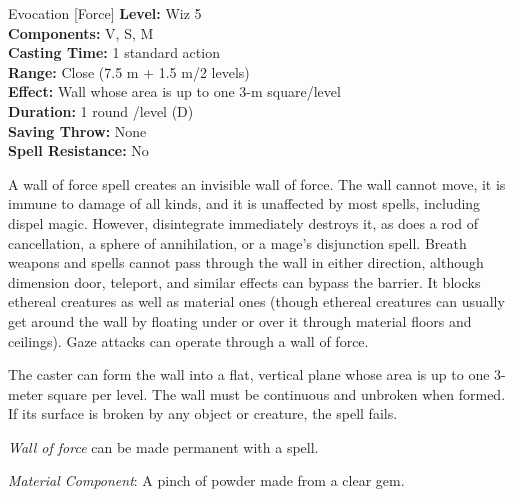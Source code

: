 {Evocation [Force]}
{
	\textbf{Level:}
	Wiz 5\\
	\textbf{Components:}
	V, S, M\\
	\textbf{Casting Time:}
	1 standard action\\
	\textbf{Range:}
	Close (7.5 m + 1.5 m/2 levels)\\
	\textbf{Effect:}
	Wall whose area is up to one 3-m square/level\\
	\textbf{Duration:}
	1 round /level (D)\\
	\textbf{Saving Throw:}
	None\\
	\textbf{Spell Resistance:}
	No\\
}
{
	A wall of force spell creates an invisible wall of force. The wall cannot move, it is immune to damage of all kinds, and it is unaffected by most spells, including dispel magic. However, disintegrate immediately destroys it, as does a rod of cancellation, a sphere of annihilation, or a mage's disjunction spell. Breath weapons and spells cannot pass through the wall in either direction, although dimension door, teleport, and similar effects can bypass the barrier. It blocks ethereal creatures as well as material ones (though ethereal creatures can usually get around the wall by floating under or over it through material floors and ceilings). Gaze attacks can operate through a wall of force.

	The caster can form the wall into a flat, vertical plane whose area is up to one 3-meter square per level. The wall must be continuous and unbroken when formed. If its surface is broken by any object or creature, the spell fails.

	\emph{Wall of force} can be made permanent with a  spell.

	\textit{Material Component}:
	A pinch of powder made from a clear gem.

}
